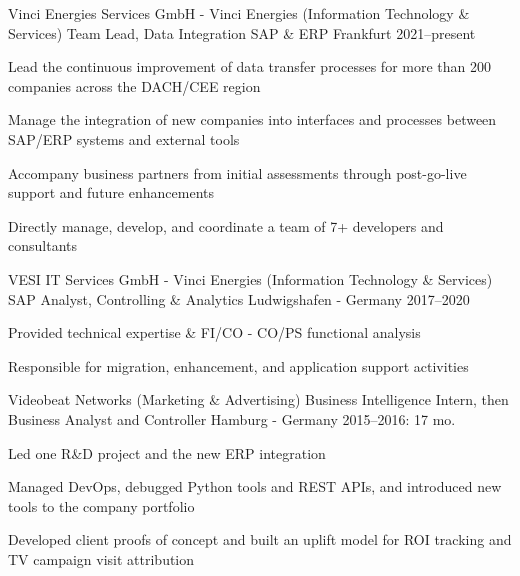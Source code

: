 

\begin{cventries}
  \cventry
    {Vinci Energies Services GmbH - Vinci Energies (Information Technology \& Services)} %
    {Team Lead, Data Integration SAP \& ERP} %
    {Frankfurt} %
    {2021--present} %
    {
      \begin{cvitems} %
        \item {Lead the continuous improvement of data transfer processes for more than 200 companies across the DACH/CEE region}
        \item {Manage the integration of new companies into interfaces and processes between SAP/ERP systems and external tools}
        \item {Accompany business partners from initial assessments through post-go-live support and future enhancements}
        \item {Directly manage, develop, and coordinate a team of 7+ developers and consultants}
      \end{cvitems}
    }

  \cventry
    {VESI IT Services GmbH - Vinci Energies (Information Technology \& Services)} %
    {SAP Analyst, Controlling \& Analytics} %
    {Ludwigshafen - Germany} %
    {2017--2020} %
    {
      \begin{cvitems} %
        \item {Provided technical expertise \& FI/CO - CO/PS functional analysis}
        \item {Responsible for migration, enhancement, and application support activities}
      \end{cvitems}
    }

  \cventry
    {Videobeat Networks (Marketing \& Advertising)} %
    {Business Intelligence Intern, then Business Analyst and Controller} %
    {Hamburg - Germany} %
    {2015--2016: 17 mo.} %
    {
      \begin{cvitems} %
        \item {Led one R\&D project and the new ERP integration}
        \item {Managed DevOps, debugged Python tools and REST APIs, and introduced new tools to the company portfolio}
        \item {Developed client proofs of concept and built an uplift model for ROI tracking and TV campaign visit attribution}
      \end{cvitems}
    }


\end{cventries}
